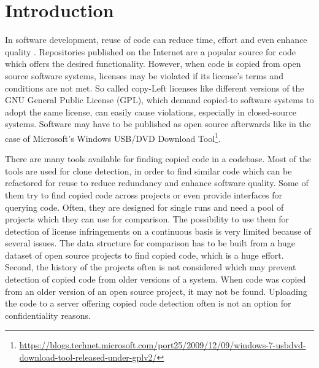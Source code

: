
\chapter{Introduction}\label{chapter:introduction}
In software development, reuse of code can reduce time, effort and even enhance quality \cite{krueger1992software}.
Repositories published on the Internet are a popular source for code which offers the desired functionality.
However, when code is copied from open source software systems, licenses may be violated if its license's terms and conditions are not met.
So called copy-Left licenses like different versions of the GNU General Public License (GPL), which demand copied-to software systems to adopt the same license, can easily cause violations, especially in closed-source systems.
Software may have to be published as open source afterwards like in the case of Microsoft's \glqq Windows USB/DVD Download Tool\grqq\footnote{\href{https://blogs.technet.microsoft.com/port25/2009/12/09/windows-7-usbdvd-download-tool-released-under-gplv2/}{https://blogs.technet.microsoft.com/port25/2009/12/09/windows-7-usbdvd-download-tool-released-under-gplv2/}}.

There are many tools available for finding copied code in a codebase.
Most of the tools are used for clone detection, in order to find similar code which can be refactored for reuse to reduce redundancy and enhance software quality.
Some of them try to find copied code across projects or even provide interfaces for querying code.
Often, they are designed for single runs and need a pool of projects which they can use for comparison.
The possibility to use them for detection of license infringements on a continuous basis is very limited because of several issues.
The data structure for comparison has to be built from a huge dataset of open source projects to find copied code, which is a huge effort.
Second, the history of the projects often is not considered which may prevent detection of copied code from older versions of a system.
When code was copied from an older version of an open source project, it may not be found.
Uploading the code to a server offering copied code detection often is not an option for confidentiality reasons.

